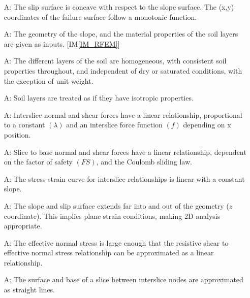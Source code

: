 \documentclass[12pt]{article}
\newcounter{assumpnum} %
\newcommand{\iref}[1]{IM\ref{#1}}
\begin{document}
\begin{enumerate}[label=A\arabic*:,ref={\arabic*}]
\item [A\refstepcounter{assumpnum}\theassumpnum: \label{A_Concave}] The
  slip surface is concave with respect to the slope surface. The (x,y)
  coordinates of the failure surface follow a monotonic function.

\item [A\refstepcounter{assumpnum}\theassumpnum: \label{A_Input}] The
  geometry of the slope, and the material properties of the soil
  layers are given as inputs. [\iref{IM_RFEM}]

\item [A\refstepcounter{assumpnum}\theassumpnum: \label{A_Homo}] The
  different layers of the soil are homogeneous, with consistent soil
  properties throughout, and independent of dry or saturated
  conditions, with the exception of unit weight.

\item [A\refstepcounter{assumpnum}\theassumpnum: \label{A_Isotropic}]
  Soil layers are treated as if they have isotropic properties.
  
\item [A\refstepcounter{assumpnum}\theassumpnum: \label{A_Base}]
  Interslice normal and shear forces have a linear relationship,
  proportional to a constant $\left({\lambda}\right)$ and an
  interslice force function $\left({f}\right)$ depending on x
  position.

\item [A\refstepcounter{assumpnum}\theassumpnum: \label{A_Interslice}]
  Slice to base normal and shear forces have a linear relationship,
  dependent on the factor of safety $\left({FS}\right)$, and the
  Coulomb sliding law.

\item
  [A\refstepcounter{assumpnum}\theassumpnum: \label{A_StressStrain}]
  The stress-strain curve for interslice relationships is linear with
  a constant slope.
  
\item [A\refstepcounter{assumpnum}\theassumpnum: \label{A_2D}] The
  slope and slip surface extends far into and out of the geometry ($z$
  coordinate). This implies plane strain conditions, making 2D
  analysis appropriate.

\item [A\refstepcounter{assumpnum}\theassumpnum: \label{A_Lin}] The
  effective normal stress is large enough that the resistive shear to
  effective normal stress relationship can be approximated as a linear
  relationship.

\item [A\refstepcounter{assumpnum}\theassumpnum: \label{A_Straight}]
  The surface and base of a slice between interslice nodes are
  approximated as straight lines.
\end{enumerate}
\end{document}

